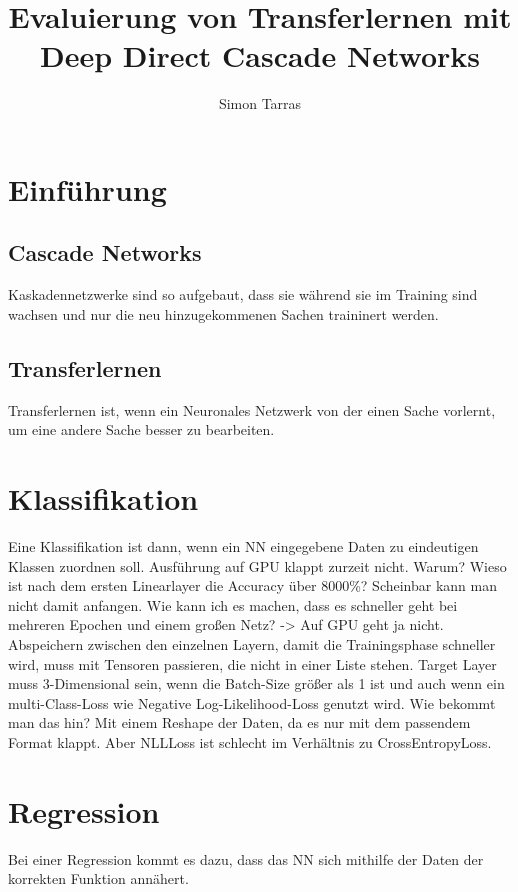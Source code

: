 \documentclass[ngerman]{report}
\title{Evaluierung von Transferlernen mit Deep Direct Cascade Networks}
\author{Simon Tarras}
\begin{document}
    \maketitle
    \chapter{Einführung}
        \section{Cascade Networks}
        Kaskadennetzwerke sind so aufgebaut, dass sie während sie 
        im Training sind wachsen und nur die neu hinzugekommenen 
        Sachen traininert werden.
        \section{Transferlernen}
        Transferlernen ist, wenn ein Neuronales Netzwerk von der 
        einen Sache vorlernt, um eine andere Sache besser zu 
        bearbeiten.
    \chapter{Klassifikation}
    Eine Klassifikation ist dann, wenn ein NN eingegebene Daten zu 
    eindeutigen Klassen zuordnen soll.
    Ausführung auf GPU klappt zurzeit nicht. Warum?
    Wieso ist nach dem ersten Linearlayer die Accuracy über 8000\%?
    Scheinbar kann man nicht damit anfangen.
    Wie kann ich es machen, dass es schneller geht bei mehreren Epochen 
    und einem großen Netz? -> Auf GPU geht ja nicht.
    Abspeichern zwischen den einzelnen Layern, damit die Trainingsphase 
    schneller wird, muss mit Tensoren passieren, die nicht in einer Liste 
    stehen. 
    Target Layer muss 3-Dimensional sein, wenn die Batch-Size größer als 1 
    ist und auch wenn ein multi-Class-Loss wie Negative Log-Likelihood-Loss 
    genutzt wird. Wie bekommt man das hin?
    Mit einem Reshape der Daten, da es nur mit dem passendem Format klappt. 
    Aber NLLLoss ist schlecht im Verhältnis zu CrossEntropyLoss.
    \chapter{Regression}
    Bei einer Regression kommt es dazu, dass das NN sich mithilfe 
    der Daten der korrekten Funktion annähert.
\end{document}
